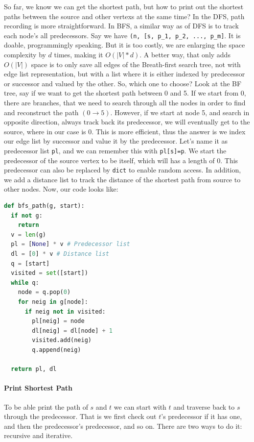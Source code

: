 \documentclass[main.tex]{subfiles}
\begin{document}
So far, we know we can get the shortest path, but how to print out the shortest paths between the source and other vertexs at the same time? In the DFS, path recording is more straightforward. In BFS, a similar way as of DFS is to track each node's all predecessors. Say we have \texttt{(n, [s, p\_1, p\_2, ..., p\_m]}. It is doable, programmingly speaking. But it is too costly, we are enlarging the space complexity by $d$ times, making it $O(|V|*d)$. A better way, that only adds $O(|V|)$ space is to only save all edges of the Breath-first search tree, not with edge list representation, but with a list where it is either indexed by predecessor or successor and valued by the other. So, which one to choose? Look at the BF tree, say if we want to get the shortest path between 0 and 5. If we start from 0, there are branches, that we need to search through all the nodes in order to find and reconstruct the path $(0\rightarrow 5)$. However, if we start at node 5, and  search in opposite direction, always track back its predecessor, we will eventually get to the source, where in our case is 0.  This is more efficient, thus the answer is we index our edge list by successor and value it by the predecessor. Let's name it as predecessor list \texttt{pl}, and we can remember this with \texttt{pl[s]=p}. We start the predecessor of the source vertex to be itself, which will has a length of 0. This predecessor can also be replaced by \texttt{dict} to enable random access. In addition, we add a distance list to track the distance of the shortest path from source to other nodes.  Now, our code looks like:
\begin{lstlisting}[language=Python]
def bfs_path(g, start):
  if not g:
    return 
  v = len(g)
  pl = [None] * v # Predecessor list
  dl = [0] * v # Distance list
  q = [start]
  visited = set([start])
  while q:
    node = q.pop(0)
    for neig in g[node]:
      if neig not in visited:
        pl[neig] = node
        dl[neig] = dl[node] + 1
        visited.add(neig)
        q.append(neig)
  
  return pl, dl
\end{lstlisting}
\paragraph{Print Shortest Path} To be able print the path of $s$ and $t$ we can start with $t$ and traverse back to $s$ through the predecessor. That is we first check out $t$'s predecessor if it has one, and then the predecessor's predecessor, and so on. There are two ways to do it: recursive and iterative.  
\end{document}
